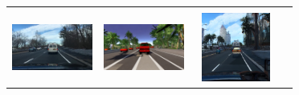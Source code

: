 \documentclass{VUMIFPSbakalaurinis}
\begin{document}
\begin{table}[H]
{\begin{tabular}{|c|c|c|c|}
            \hline
            \\
            \includegraphics[width=100,height=85]{img/original/7c302d09-d4da21c8} & 
            \includegraphics[width=100,height=85]{img/diffusion/controlnet/7c302d09-d4da21c8} & 
            \includegraphics[width=100,height=85]{img/diffusion/cycle/7c302d09-d4da21c8} & 

\end{tabular}}
\end{table}
\end{document}
